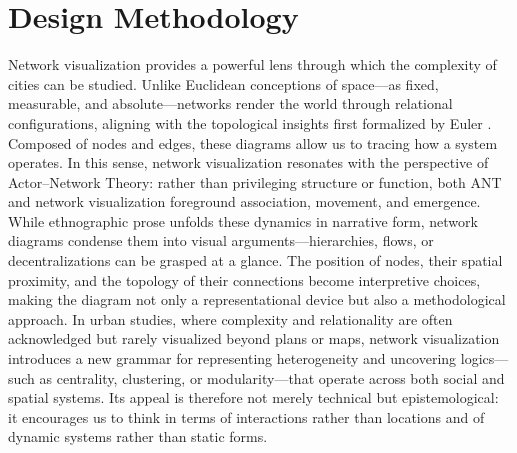 \documentclass[land,article,accept,pdftex,oneauthor]{Definitions/mdpi}
\begin{document}
{%

\section{Design Methodology}\label{sec3}

Network visualization provides a powerful lens through which the complexity of cities can be studied. Unlike Euclidean conceptions of space---as fixed, measurable, and \mbox{absolute---networks} render the world through relational configurations, aligning with the topological insights first formalized by Euler \cite{shields_cultural_2012}. Composed of nodes and edges, these diagrams allow us  {to tracing how a system operates}. In this sense, network visualization resonates with the perspective of  {Actor--Network Theory}: rather than privileging structure or function, both ANT and network visualization foreground association, movement, and emergence. While ethnographic prose unfolds these dynamics in narrative form, network diagrams condense them into visual arguments---hierarchies, flows, or decentralizations can be grasped at a glance. The position of nodes, their spatial proximity, and the topology of their connections become interpretive choices, making the diagram not only a representational device but also a methodological approach. In urban studies, where complexity and relationality are often acknowledged but rarely visualized beyond plans or maps, network visualization introduces a new grammar for representing heterogeneity and uncovering logics---such as centrality, clustering, or modularity---that operate across both social and spatial systems. Its appeal is therefore not merely technical but epistemological: it encourages us to think in terms of interactions rather than locations and of dynamic systems rather than static forms.


}
\end{document}
